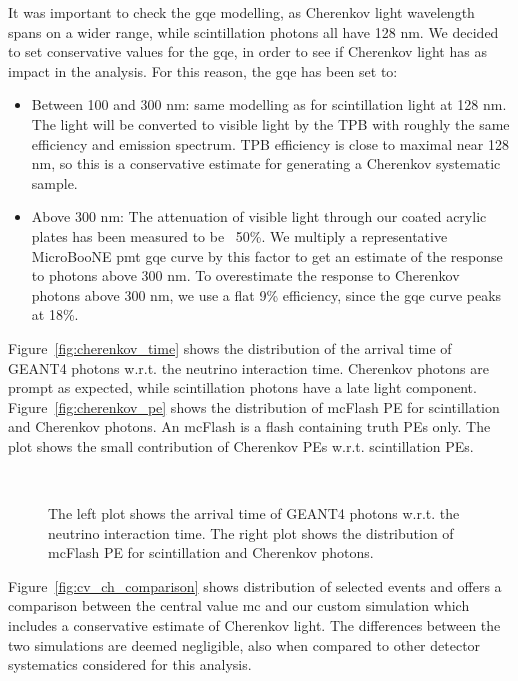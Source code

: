 It was important to check the \acrshort{gqe} modelling, as Cherenkov light wavelength spans on a wider range, while scintillation photons all have 128 nm. We decided to set conservative values for the \acrshort{gqe}, in order to see if Cherenkov light has as impact in the analysis. For this reason, the \acrshort{gqe} has been set to:
\begin{itemize}
\item Between 100 and 300 nm: same modelling as for scintillation light at 128 nm. The light will be converted to visible light by the TPB with roughly the same efficiency and emission spectrum. TPB efficiency is close to maximal near 128 nm, so this is a conservative estimate for generating a Cherenkov systematic sample.
\item Above 300 nm: The attenuation of visible light through our coated acrylic plates has been measured to be ~50\%.  We multiply a representative MicroBooNE \acrshort{pmt} \acrshort{gqe} curve by this factor to get an estimate of the response to photons above 300 nm. To overestimate the response to Cherenkov photons above 300 nm, we use a flat 9\% efficiency, since the \acrshort{gqe} curve peaks at 18\%.
\end{itemize} 

Figure~\ref{fig:cherenkov_time} shows the distribution of the arrival time of GEANT4 photons w.r.t. the neutrino interaction time. Cherenkov photons are prompt as expected, while scintillation photons have a late light component.
Figure~\ref{fig:cherenkov_pe} shows the distribution of \acrshort{mc}Flash PE for scintillation and Cherenkov photons. An \acrshort{mc}Flash is a flash containing truth PEs only. The plot shows the small contribution of Cherenkov PEs w.r.t. scintillation PEs.

\begin{figure}[]
\centering
{} \quad
{} \\
\caption{The left plot shows the arrival time of GEANT4 photons w.r.t. the neutrino interaction time. The right plot shows the distribution of \acrshort{mc}Flash PE for scintillation and Cherenkov photons.}
\label{fig:cherenkov_validation}
\end{figure}


Figure~\ref{fig:cv_ch_comparison} shows distribution of selected events and offers a comparison between the central value \acrshort{mc} and our custom simulation which includes a conservative estimate of Cherenkov light. The differences between the two simulations are deemed negligible, also when compared to other detector systematics considered for this analysis.

